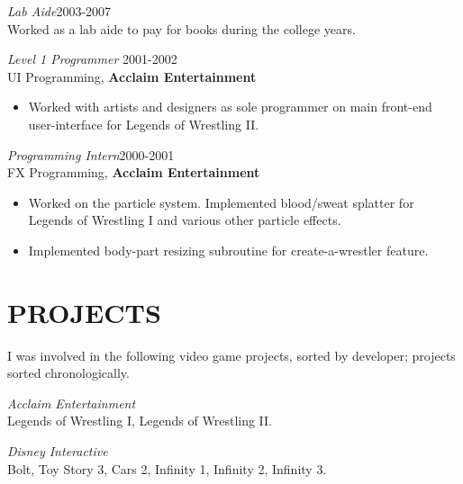 \documentclass[margin]{res}
\begin{document}
\begin{resume}
		{\sl Lab Aide}\hfill 2003-2007 \\
		Worked as a lab aide to pay for books during the college years.

                {\sl Level 1 Programmer} \hfill 2001-2002 \\
		UI Programming, {\bf Acclaim Entertainment}
                  \begin{itemize}\itemsep -2pt %
                   \item Worked with artists and designers as sole programmer on main front-end user-interface for Legends of Wrestling II.
                   \end{itemize} 

		{\sl Programming Intern}\hfill 2000-2001 \\
		FX Programming, {\bf Acclaim Entertainment}
		\begin{itemize}\itemsep -2pt %
		\item Worked on the particle system.  Implemented blood/sweat splatter for Legends of Wrestling I and various other particle effects.
		\item Implemented body-part resizing subroutine for create-a-wrestler feature.
		\end{itemize}

\section{PROJECTS}
		I was involved in the following video game projects, sorted by developer; projects sorted chronologically.

		{\sl Acclaim Entertainment}\\
		Legends of Wrestling I, Legends of Wrestling II.
		
		{\sl Disney Interactive}\\
		Bolt, Toy Story 3, Cars 2, Infinity 1, Infinity 2, Infinity 3.


\end{resume}
\end{document}
